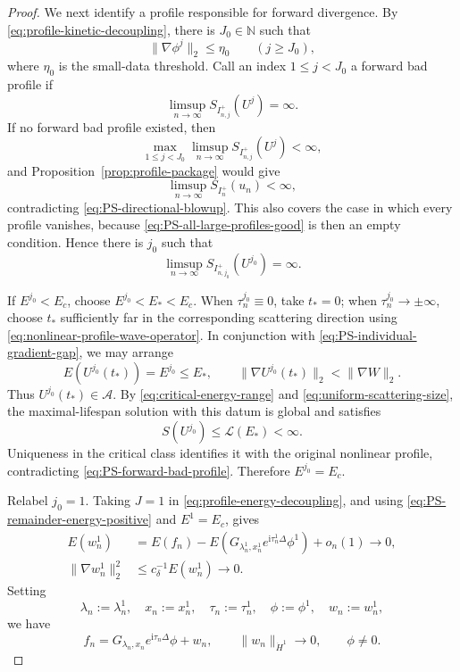 \documentclass{interact}
\numberwithin{equation}{section}
\theoremstyle{plain}
\theoremstyle{definition}
\theoremstyle{remark}
\newcommand{\ii}{\mathrm i}
\begin{document}
\begin{proof}
We next identify a profile responsible for forward divergence. By \eqref{eq:profile-kinetic-decoupling}, there is $J_0\in\mathbb N$ such that
\[
 \|\nabla\phi^j\|_2\le\eta_0
 \qquad(j\ge J_0),
\]
where $\eta_0$ is the small-data threshold. Call an index $1\le j<J_0$ a forward bad profile if
\[
 \limsup_{n\to\infty}S_{I_{n,j}^+}(U^j)=\infty.
\]
If no forward bad profile existed, then
\begin{equation}\label{eq:PS-all-large-profiles-good}
 \max_{1\le j<J_0}
 \limsup_{n\to\infty}S_{I_{n,j}^+}(U^j)<\infty,
\end{equation}
and Proposition~\ref{prop:profile-package} would give
\[
 \limsup_{n\to\infty}S_{I_n^+}(u_n)<\infty,
\]
contradicting \eqref{eq:PS-directional-blowup}. This also covers the case in which every profile vanishes, because \eqref{eq:PS-all-large-profiles-good} is then an empty condition. Hence there is $j_0$ such that
\begin{equation}\label{eq:PS-forward-bad-profile}
 \limsup_{n\to\infty}S_{I_{n,j_0}^+}(U^{j_0})=\infty.
\end{equation}

If $E^{j_0}<E_c$, choose $E^{j_0}<E_*<E_c$. When $\tau_n^{j_0}\equiv0$, take $t_*=0$; when $\tau_n^{j_0}\to\pm\infty$, choose $t_*$ sufficiently far in the corresponding scattering direction using \eqref{eq:nonlinear-profile-wave-operator}. In conjunction with \eqref{eq:PS-individual-gradient-gap}, we may arrange
\[
 E(U^{j_0}(t_*))=E^{j_0}\le E_*,
 \qquad
 \|\nabla U^{j_0}(t_*)\|_2<\|\nabla W\|_2.
\]
Thus $U^{j_0}(t_*)\in\mathcal A$. By \eqref{eq:critical-energy-range} and \eqref{eq:uniform-scattering-size}, the maximal-lifespan solution with this datum is global and satisfies
\[
 S(U^{j_0})\le\mathcal L(E_*)<\infty.
\]
Uniqueness in the critical class identifies it with the original nonlinear profile, contradicting \eqref{eq:PS-forward-bad-profile}. Therefore $E^{j_0}=E_c$.

Relabel $j_0=1$. Taking $J=1$ in \eqref{eq:profile-energy-decoupling}, and using \eqref{eq:PS-remainder-energy-positive} and $E^1=E_c$, gives
\begin{align*}
 E(w_n^1)
 &=E(f_n)-E\!\left(G_{\lambda_n^1,x_n^1}
 e^{\ii\tau_n^1\Delta}\phi^1\right)+o_n(1)
 \longrightarrow0,\\
 \|\nabla w_n^1\|_2^2
 &\le c_\delta^{-1}E(w_n^1)
 \longrightarrow0.
\end{align*}
Setting
\[
 \lambda_n:=\lambda_n^1,
 \quad x_n:=x_n^1,
 \quad \tau_n:=\tau_n^1,
 \quad \phi:=\phi^1,
 \quad w_n:=w_n^1,
\]
we have
\begin{equation}\label{eq:PS-single-profile-data}
 f_n=G_{\lambda_n,x_n}e^{\ii\tau_n\Delta}\phi+w_n,
 \qquad
 \|w_n\|_{\dot H^1}\to0,
 \qquad \phi\ne0.
\end{equation}


\end{proof}
\end{document}
